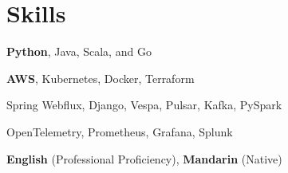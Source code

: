 \documentclass{article}
\begin{document}
\section{Skills}
\begin{description}[widest=Langauges]
	\item[Programming Skills:]
		\textbf{Python}, Java, Scala, and Go
	\item[Cloud \& Infrastructure:]
		\textbf{AWS}, Kubernetes, Docker, Terraform
	\item[Technical stack:]
	    Spring Webflux, Django, Vespa, Pulsar, Kafka, PySpark
	\item[Monitoring \& Observability:]
		OpenTelemetry, Prometheus, Grafana, Splunk
	\item[Languages:]
		\textbf{English} (Professional Proficiency), \textbf{Mandarin} (Native)
\end{description}
\end{document}
